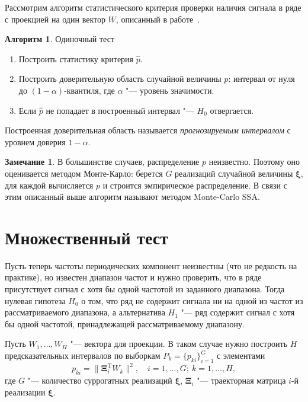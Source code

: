 \documentclass[specialist,
substylefile = spbu_report.rtx,
subf,href,colorlinks=true, 12pt]{disser}
\newcommand{\transponse}{^\mathrm{T}}
\theoremstyle{definition}
\newtheorem{algorithm}{Алгоритм}
\newtheorem{remark}{Замечание}
\begin{document}
Рассмотрим алгоритм статистического критерия проверки наличия сигнала в ряде с проекцией на один вектор $W$, описанный в работе~\cite{Golyandina_2023}.
\begin{algorithm}{Одиночный тест~\cite{Golyandina_2023}}
	\begin{enumerate}
		\item Построить статистику критерия $\widehat p$.
		\item Построить доверительную область случайной величины $p$: интервал от нуля до $(1-\alpha)$-квантиля, где $\alpha$ "--- уровень значимости.
		\item Если $\widehat p$	не попадает в построенный интервал "--- $H_0$ отвергается.
	\end{enumerate}
\end{algorithm}
Построенная доверительная область называется \textit{прогнозируемым интервалом} с уровнем доверия $1-\alpha$.
\begin{remark}
В большинстве случаев, распределение $p$ неизвестно. Поэтому оно оценивается методом Монте-Карло: берется $G$ реализаций случайной величины $\boldsymbol\xi$, для каждой вычисляется $p$ и строится эмпирическое распределение. В связи с этим описанный выше алгоритм называют методом Monte-Carlo SSA.
\end{remark}
\section{Множественный тест}
Пусть теперь частоты периодических компонент неизвестны (что не редкость на практике), но известен диапазон частот и нужно проверить, что в ряде присутствует сигнал с хотя бы одной частотой из заданного диапазона. Тогда нулевая гипотеза $H_0$ о том, что ряд не содержит сигнала ни на одной из частот из рассматриваемого диапазона, а альтернатива $H_1$ "--- ряд содержит сигнал с хотя бы одной частотой, принадлежащей рассматриваемому диапазону.

Пусть $W_1,\ldots,W_H$ "--- вектора для проекции. В таком случае нужно построить $H$ предсказательных интервалов по выборкам $P_k=\{p_{ki}\}_{i=1}^G$ с элементами
\begin{equation}
	p_{ki}=\|\mathbf{\Xi}_i\transponse W_k\|^2,\quad i=1,\ldots,G;\ k=1,\ldots,H,
\end{equation}
где $G$ "--- количество суррогатных реализаций $\boldsymbol{\xi}$, $\mathbf{\Xi}_i$ "--- траекторная матрица $i$-й реализации $\boldsymbol{\xi}$.
\end{document}
